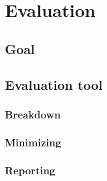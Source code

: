 \chapter{Evaluation}\label{C:eval}
%

\section{Goal}

\section{Evaluation tool}\label{S:eval-tool}

\subsection{Breakdown}

\subsection{Minimizing}

\subsection{Reporting}


